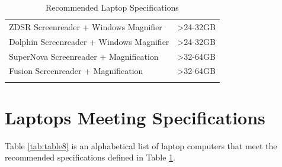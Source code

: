 \begin{longtable}[]{@{}
	>{\raggedright\arraybackslash}m{}
	>{\raggedright\arraybackslash}b{}@{}
	}
	ZDSR Screenreader + Windows Magnifier                                                                                                                                                                                                                                            & \textgreater24-32GB \\[1.0em]
	Dolphin Screenreader + Windows Magnifier                                                                                                                                                                                                                                         & \textgreater24-32GB \\[1.0em]
	SuperNova Screenreader + Magnification                                                                                                                                                                                                                                           & \textgreater32-64GB \\[1.0em]
	Fusion Screenreader + Magnification                                                                                                                                                                                                                                              & \textgreater32-64GB \\[1.0em] \hline
	\caption{Recommended Laptop Specifications}\label{tab:table7}
\end{longtable}

\pagebreak
\hypertarget{laptops-meeting-recommended-specifications}{}\section{Laptops Meeting Specifications}\label{laptops-meeting-recommended-specifications}
Table \ref{tab:table8} is an alphabetical list of laptop computers that meet the recommended specifications defined in Table \ref{tab:table7}.

